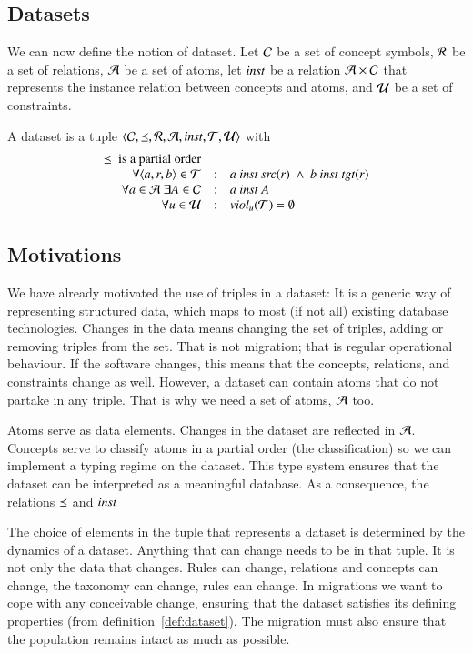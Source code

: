 \documentclass{elsarticle}
\begin{document}
\subsection{Datasets}
	We can now define the notion of dataset.
	Let	$\mathcal{C}$ be a set of concept symbols,
	$\mathcal{R}$ be a set of relations,
	$\mathcal{A}$ be a set of atoms,
	let $\text{\it inst\/}$ be a relation $\mathcal{A}\times\mathcal{C}$ that represents the instance relation between concepts and atoms,
	and $\mathcal{U}$ be a set of constraints.
\begin{definition}[dataset]
	\label{def:dataset}
	\item A dataset is a tuple $\langle\mathcal{C},\preceq,\mathcal{R},\mathcal{A},\text{\it inst\/},\mathcal{T},\mathcal{U}\rangle$ with
	\[\begin{array}[3]{rcl}
		\isa\text{\ is a partial order}\\
		\forall\triple{a}{r}{b}\in\triples&:&a\ \inst\ \src{r}\ \wedge\ b\ \inst\ \tgt{r}\\
		\forall a\in\atoms\ \exists A\in\concepts&:&a\ \inst\ A\\
		\forall u\in\rules&:&\viol{\triples}{u}=\emptyset
	\end{array}\]
\end{definition}

\subsection{Motivations}
	We have already motivated the use of triples in a dataset:
	It is a generic way of representing structured data, which maps to most (if not all) existing database technologies.
	Changes in the data means changing the set of triples, adding or removing triples from the set.
	That is not migration; that is regular operational behaviour.
	If the software changes, this means that the concepts, relations, and constraints change as well.
	However, a dataset can contain atoms that do not partake in any triple.
	That is why we need a set of atoms, $\mathcal{A}$ too.

	Atoms serve as data elements. Changes in the dataset are reflected in $\mathcal{A}$.
	Concepts serve to classify atoms in a partial order (the classification) so we can implement a typing regime on the dataset.
	This type system ensures that the dataset can be interpreted as a meaningful database.
	As a consequence, the relations $\preceq$ and $\text{\it inst\/}$

	The choice of elements in the tuple that represents a dataset is determined by the dynamics of a dataset.
	Anything that can change needs to be in that tuple.
	It is not only the data that changes. Rules can change, relations and concepts can change, the taxonomy can change,
	rules can change.
	In migrations we want to cope with any conceivable change,
	ensuring that the dataset satisfies its defining properties (from definition~\ref{def:dataset}).
	The migration must also ensure that the population remains intact as much as possible.
\end{document}
